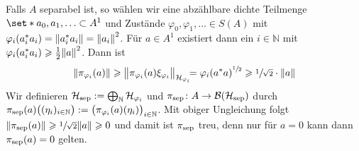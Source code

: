 \begin{beweis}
	Falls $A$ separabel ist, so wählen wir eine abzählbare dichte Teilmenge $\set*{a_0,a_1,\ldots } \subset A^1$ und Zustände $\varphi_0, \varphi_1,\ldots \in S(A)$ mit $\varphi_i(a_i^*a_i) = \norm*{a_i^*a_i}= \norm*{a_i}^2$. 
	Für $a \in A^1$ existiert dann ein $i \in \mathbb{N}$ mit $\varphi_i(a_i^*a_i) \ge \frac{1}{2} \norm*{a}^2$.
	Dann ist 
	\[
		\norm*{\pi_{\varphi_i}(a)} \ge \norm[\big]{\pi_{\varphi_i}(a) \xi_{\varphi_i}}_{\mathcal{H}_{\varphi_i}}\hspace{-1ex}
		= \varphi_i \enbrace*{a^*a}^{\sfrac{1}{2}} \ge \sfrac{1}{\sqrt{2}}\cdot \norm*{a}
	\]
	Wir definieren $\mathcal{H}_{\sep} := \bigoplus_{\mathbb{N}} \mathcal{H}_{\varphi_i}$ und $\pi_{\sep} \colon A \to \mathcal{B}(\mathcal{H}_{\sep})$ durch 
	\(
		\pi_{\sep}(a) \enbrace[\big]{(\eta_i)_{i \in \mathbb{N}}} := \enbrace[\big]{\pi_{\varphi_i}(a)(\eta_i)}_{i \in \mathbb{N}}
	\).
	Mit obiger Ungleichung folgt $\norm*{\pi_{\sep}(a)} \ge \sfrac{1}{\sqrt{2}} \norm*{a}\ge 0$ und damit ist $\pi_{\sep}$ treu, denn nur für $a=0$ kann dann $\pi_{\sep}(a)=0$ gelten.
\end{beweis}

